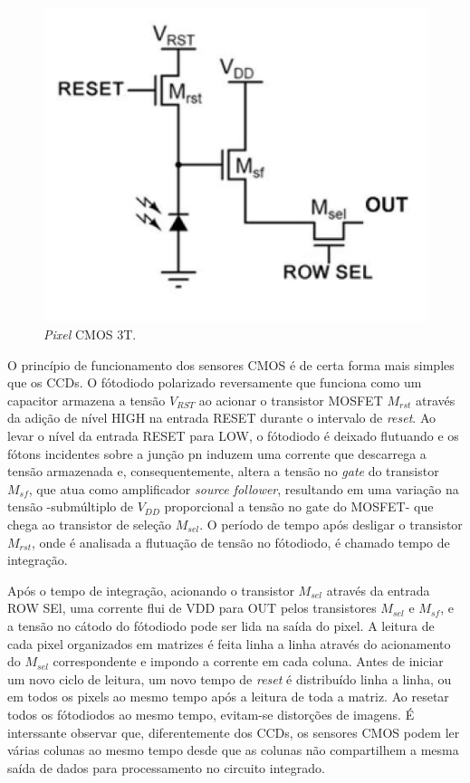 \documentclass[10pt,a4paper,twocolumn]{article}
\begin{document}
	\begin{figure}[!h]
		\centering
		\includegraphics[scale=0.12]{imagens/cmos_3t.jpg}
		\caption{\textit{Pixel} CMOS 3T.}
	\end{figure}
	
	O princípio de funcionamento dos sensores CMOS é de certa forma mais simples que os CCDs. O fótodiodo polarizado reversamente que funciona como um capacitor armazena a tensão $V_{RST}$ ao acionar o transistor MOSFET $M_{rst}$ através da adição de nível HIGH na entrada RESET durante o intervalo de \textit{reset}. Ao levar o nível da entrada RESET para LOW, o fótodiodo é deixado flutuando e os fótons incidentes sobre a junção pn induzem uma corrente que descarrega a tensão armazenada e, consequentemente, altera a tensão no \textit{gate} do transistor $M_{sf}$, que atua como amplificador \textit{source follower}, resultando em uma variação na tensão -submúltiplo de $V_{DD}$ proporcional a tensão no gate do MOSFET- que chega ao transistor de seleção $M_{sel}$. O período de tempo após desligar o transistor $M_{rst}$, onde é analisada a flutuação de tensão no fótodiodo, é chamado tempo de integração.
	
	Após o tempo de integração, acionando o transistor $M_{sel}$ através da entrada ROW SEl, uma corrente flui de VDD para OUT pelos transistores $M_{sel}$ e $M_{sf}$, e a tensão no cátodo do fótodiodo pode ser lida na saída do pixel. A leitura de cada pixel organizados em matrizes é feita linha a linha através do acionamento do $M_{sel}$ correspondente e impondo a corrente em cada coluna. Antes de iniciar um novo ciclo de leitura, um novo tempo de \textit{reset} é distribuído linha a linha, ou em todos os pixels ao mesmo tempo após a leitura de toda a matriz. Ao resetar todos os fótodiodos ao mesmo tempo, evitam-se distorções de imagens. É interssante observar que, diferentemente dos CCDs, os sensores CMOS podem ler várias colunas ao mesmo tempo desde que as colunas não compartilhem a mesma saída de dados para processamento no circuito integrado.
	
\end{document}
